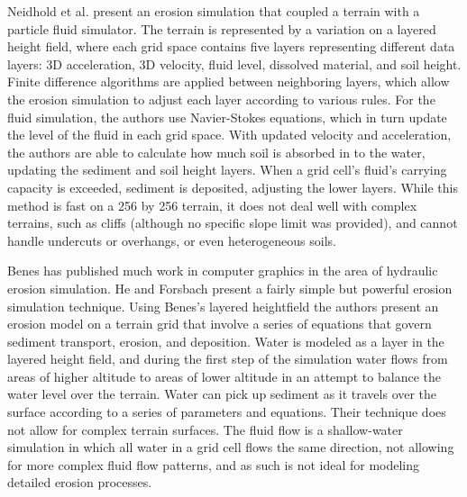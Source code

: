 Neidhold et al. \cite{Neidhold-Interactive} present an erosion simulation that coupled a terrain with a particle fluid simulator. The terrain is represented by a variation on a layered height field, where each grid space contains five layers representing different data layers: 3D acceleration, 3D velocity, fluid level, dissolved material, and soil height. Finite difference algorithms are applied between neighboring layers, which allow the erosion simulation to adjust each layer according to various rules. For the fluid simulation, the authors use Navier-Stokes equations, which in turn update the level of the fluid in each grid space. With updated velocity and acceleration, the authors are able to calculate how much soil is absorbed in to the water, updating the sediment and soil height layers. When a grid cell's fluid's carrying capacity is exceeded, sediment is deposited, adjusting the lower layers. While this method is fast on a 256 by 256 terrain, it does not deal well with complex terrains, such as cliffs (although no specific slope limit was provided), and cannot handle undercuts or overhangs, or even heterogeneous soils.

Benes has published much work in computer graphics in the area of hydraulic erosion simulation. He and Forsbach \cite{Benes-SimulationHydraulicErosion} present a fairly simple but powerful erosion simulation technique. Using Benes's layered heightfield \cite{Benes-LayeredDataRep} the authors present an erosion model on a terrain grid that involve a series of equations that govern sediment transport, erosion, and deposition. Water is modeled as a layer in the layered height field, and during the first step of the simulation water flows from areas of higher altitude to areas of lower altitude in an attempt to balance the water level over the terrain. Water can pick up sediment as it travels over the surface according to a series of parameters and equations. Their technique does not allow for complex terrain surfaces. The fluid flow is a shallow-water simulation in which all water in a grid cell flows the same direction, not allowing for more complex fluid flow patterns, and as such is not ideal for modeling detailed erosion processes.

